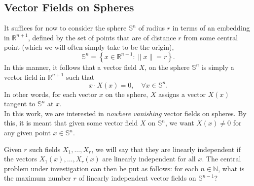 \subsection{Vector Fields on Spheres}
It suffices for now to consider the sphere $\mathbb{S}^n$ of radius $r$ in terms of an embedding in $\mathbb{R}^{n+1}$, defined by the set of points that are of distance $r$ from some central point (which we will often simply take to be the origin),
\[
\mathbb{S}^n=\left\{x\in\mathbb{R}^{n+1}:\|x\|=r\right\}.
\] 
In this manner, it follows that a vector field $X$, on the sphere $\mathbb{S}^n$ is simply a vector field in $\mathbb{R}^{n+1}$ such that
\[
x\cdot X(x)=0,\quad \forall x\in\mathbb{S}^n.
\]
In other words, for each vector $x$ on the sphere, $X$ assigns a vector $X(x)$ tangent to $\mathbb{S}^n$ at $x$.
\hfill\\

\noindent In this work, we are interested in \textit{nowhere vanishing} vector fields on spheres. By this, it is meant that given some vector field $X$ on $\mathbb{S}^n$, we want $X(x)\neq 0$ for any given point $x\in\mathbb{S}^n$.

Given $r$ such fields $X_1,\ldots,X_r$, we will say that they are linearly independent if the vectors $X_1(x),\ldots,X_r(x)$ are linearly independent for all $x$. The central problem under investigation can then be put as follows: for each $n\in\mathbb{N}$, what is the maximum number $r$ of linearly independent vector fields on $\mathbb{S}^{n-1}$?


